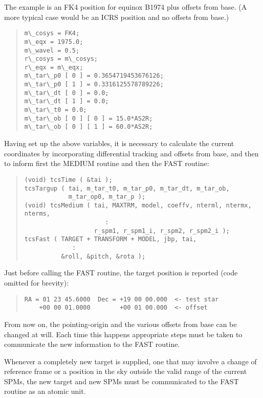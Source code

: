 \documentclass[12pt,fleqn,twoside]{article}
\renewcommand{\_}{{\tt\char'137}}     %
\begin{document}
The example is an FK4
position for equinox B1974 plus offsets from base.  (A more
typical case would be an ICRS position and no offsets from base.)
\begin{quote}
\begin{small}
\begin{verbatim}
m\_cosys = FK4;
m\_eqx = 1975.0;
m\_wavel = 0.5;
r\_cosys = m\_cosys;
r\_eqx = m\_eqx;
m\_tar\_p0 [ 0 ] = 0.3654719453676126;
m\_tar\_p0 [ 1 ] = 0.3316125578789226;
m\_tar\_dt [ 0 ] = 0.0;
m\_tar\_dt [ 1 ] = 0.0;
m\_tar\_t0 = 0.0;
m\_tar\_ob [ 0 ] [ 0 ] = 15.0*AS2R;
m\_tar\_ob [ 0 ] [ 1 ] = 60.0*AS2R;
\end{verbatim}\end{small}
\end{quote}
Having set up the above variables, it is necessary to calculate
the current coordinates by incorporating differential tracking
and offsets from base, and then to inform first the
MEDIUM routine and then the FAST routine:
\begin{quote}
\begin{small}
\begin{verbatim}
(void) tcsTime ( &tai );
tcsTargup ( tai, m_tar_t0, m_tar_p0, m_tar_dt, m_tar_ob,
            m_tar_op0, m_tar_p );
(void) tcsMedium ( tai, MAXTRM, model, coeffv, nterml, ntermx, nterms,
                      :
                   r_spm1, r_spm1_i, r_spm2, r_spm2_i );
tcsFast ( TARGET + TRANSFORM + MODEL, jbp, tai,
             :
          &roll, &pitch, &rota );
\end{verbatim}\end{small}
\end{quote}
Just before calling the FAST routine, the target position
is reported (code omitted for brevity):
\begin{quote}
\begin{small}
\begin{verbatim}
RA = 01 23 45.6000  Dec = +19 00 00.000  <- test star
    +00 00 01.0000        +00 01 00.000  <- offset
\end{verbatim}\end{small}
\end{quote}
From now on, the pointing-origin and the various offsets from base
can be changed at will.  Each time this happens appropriate steps
must be taken to communicate the new information to the FAST routine.

Whenever a completely new target is supplied, one that may involve
a change of reference frame or a position in the sky outside the
valid range of the current SPMs, the new target and new SPMs must
be communicated to the FAST routine as an atomic unit.
\end{document}
